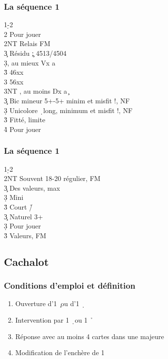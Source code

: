 \documentclass[a4paper]{article}
\begin{document}
\subsubsection{La séquence 1\pdfh}

\begin{bidtable}
1\d-2\h\\
2\s \> Pour jouer\\
2NT \> Relais FM\+\\
3\c \> Résidu \c ; 4513/4504\\
3\d {}, au mieux Vx a \c \\
3\h \> 46xx\\
3\s \> 56xx\\
3NT , au moins Dx a \c \-\\
3\c \> Bic mineur 5+-5+ minim et misfit !, NF\\
3\d \> Unicolore \d\ long, minimum et misfit !, NF\\
3\h\s \> Fitté, limite\\
4\h\s \> Pour jouer
\end{bidtable}

\subsubsection{La séquence 1\pdfs}

\begin{bidtable}
1\d-2\s\\
2NT \> Souvent 18-20 régulier, FM\+\\
3\c \> Des valeurs, max\\
3\d \> Mini\\
3\h\s \> Court \h /\s \-\\
3\c \> Naturel 3+ \s \\
3\d \> Pour jouer\\
3\h\s \> Valeurs, FM
\end{bidtable}

\subsection{Cachalot}

\subsubsection{Conditions d'emploi et définition}

\begin{enumerate}
\item Ouverture d’1 \c\ ou d’1 \d\ 

\item Intervention par 1 \d\ ou 1 \h\ 

\item Réponse avec au moins 4 cartes dans une majeure

\item Modification de l’enchère de 1 \s 

\end{enumerate}
\end{document}
